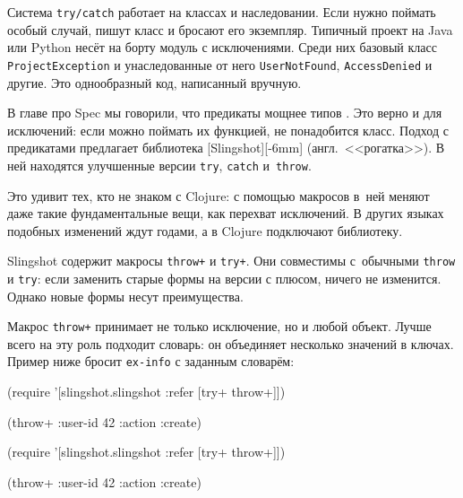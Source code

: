 
Система \verb|try/catch| работает на классах и наследовании. Если нужно
поймать особый случай, пишут класс и бросают его экземпляр. Типичный проект на
Java или Python несёт на борту модуль с исключениями. Среди них базовый класс
\verb|ProjectException| и унаследованные от него \verb|UserNotFound|,
\verb|AccessDenied| и другие. Это однообразный код, написанный вручную.


В главе про Spec мы говорили, что предикаты мощнее типов
. Это верно и для исключений: если можно поймать их
функцией, не понадобится класс. Подход с предикатами предлагает библиотека
[Slingshot][-6mm] (англ.~<<рогатка>>).
В ней находятся улучшенные версии \verb|try|, \verb|catch| и~\verb|throw|.


Это удивит тех, кто не знаком с Clojure: с помощью макросов в~ней меняют даже
такие фундаментальные вещи, как перехват исключений. В других языках подобных
изменений ждут годами, а в Clojure подключают библиотеку.


Slingshot содержит макросы \verb|throw+| и \verb|try+|. Они совместимы
с~обычными \verb|throw| и \verb|try|: если заменить старые формы на версии с
плюсом, ничего не изменится. Однако новые формы несут преимущества.

Макрос \verb|throw+| принимает не только исключение, но и любой объект. Лучше
всего на эту роль подходит словарь: он объединяет несколько значений в
ключах. Пример ниже бросит \verb|ex-info| с заданным словарём:

\ifx\devicetype\mobile

\begin{english}
  \begin{clojure}
(require
  '[slingshot.slingshot
    :refer [try+ throw+]])

(throw+ {:user-id 42 :action :create})
  \end{clojure}
\end{english}

\else

\begin{english}
  \begin{clojure}
(require '[slingshot.slingshot :refer [try+ throw+]])

(throw+ {:user-id 42 :action :create})
  \end{clojure}
\end{english}

